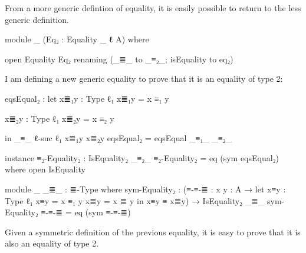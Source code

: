 \documentclass{article}
\begin{document}
From a more generic defintion of equality,
it is easily possible to return to the less generic definition.

\begin{code}
    module _
      (Eq₂ : Equality {_} {ℓ} {A})
      where

      open Equality Eq₂ renaming (_≣_ to _≡₂_; isEquality to eq₂)
\end{code}

I am defining a new generic equality to prove that it is
an equality of type 2:

%

\begin{code}
      eqsEqual₂ : let
        x≣₁y : Type ℓ₁
        x≣₁y = x ≡₁ y

        x≣₂y : Type ℓ₁
        x≣₂y = x ≡₂ y

        in _≡_ {ℓ-suc ℓ₁} x≣₁y x≣₂y
      eqsEqual₂ = eqsEqual _≡₁_ _≡₂_

      instance
        ≡₂-Equality₂ : IsEquality₂ _≡₂_
        ≡₂-Equality₂ = eq (sym eqsEqual₂)
          where open IsEquality

      module _ {_≣_ : ≣-Type} where
        sym-Equality₂ : (≡-≡-≣ : {x y : A} → let
          x≡y : Type ℓ₁
          x≡y = x ≡₁ y
          x≣y = x ≣ y
          in x≡y ≡ x≣y)
          → IsEquality₂ _≣_
        sym-Equality₂ ≡-≡-≣ = eq (sym ≡-≡-≣)

\end{code}

Given a symmetric definition of the previous equality,
it is easy to prove that it is also an equality of type 2.
\end{document}
